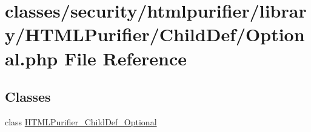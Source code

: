 \hypertarget{Optional_8php}{\section{classes/security/htmlpurifier/library/\+H\+T\+M\+L\+Purifier/\+Child\+Def/\+Optional.php File Reference}
\label{Optional_8php}
}
\subsection*{Classes}
\begin{DoxyCompactItemize}
\item 
class \hyperlink{classHTMLPurifier__ChildDef__Optional}{H\+T\+M\+L\+Purifier\+\_\+\+Child\+Def\+\_\+\+Optional}
\end{DoxyCompactItemize}
